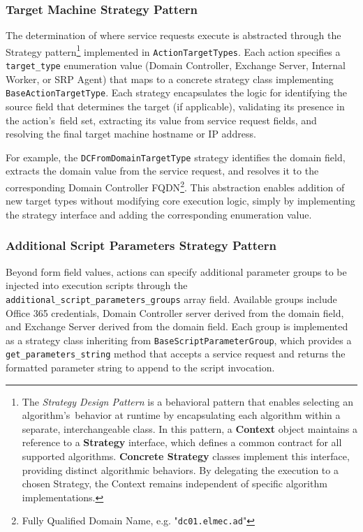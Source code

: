 \subsubsection{Target Machine Strategy Pattern}\label{sec:target_machine_strategy_pattern}

The determination of where service requests execute is abstracted through the Strategy pattern\footnote{The \textit{Strategy Design Pattern} is a behavioral pattern that enables selecting an algorithm's~behavior at runtime by encapsulating each algorithm within a separate, interchangeable class. In this pattern, a \textbf{Context} object maintains a reference to a \textbf{Strategy} interface, which defines a common contract for all supported algorithms. \textbf{Concrete Strategy} classes implement this interface, providing distinct algorithmic behaviors. By delegating the execution to a chosen Strategy, the Context remains independent of specific algorithm implementations.} implemented in \texttt{ActionTargetTypes}. Each action specifies a \texttt{target\_type} enumeration value (Domain Controller, Exchange Server, Internal Worker, or SRP Agent) that maps to a concrete strategy class implementing \texttt{BaseActionTargetType}. Each strategy encapsulates the logic for identifying the source field that determines the target (if applicable), validating its presence in the action's~field set, extracting its value from service request fields, and resolving the final target machine hostname or IP address.

For example, the \texttt{DCFromDomainTargetType} strategy identifies the domain field, extracts the domain value from the service request, and resolves it to the corresponding Domain Controller FQDN\footnote{Fully Qualified Domain Name, e.g. "\texttt{dc01.elmec.ad}"}. This abstraction enables addition of new target types without modifying core execution logic, simply by implementing the strategy interface and adding the corresponding enumeration value.

\subsubsection{Additional Script Parameters Strategy Pattern}

Beyond form field values, actions can specify additional parameter groups to be injected into execution scripts through the \texttt{additional\_script\_parameters\_groups} array field. Available groups include Office 365 credentials, Domain Controller server derived from the domain field, and Exchange Server derived from the domain field. Each group is implemented as a strategy class inheriting from \texttt{BaseScriptParameterGroup}, which provides a \texttt{get\_parameters\_string} method that accepts a service request and returns the formatted parameter string to append to the script invocation.

